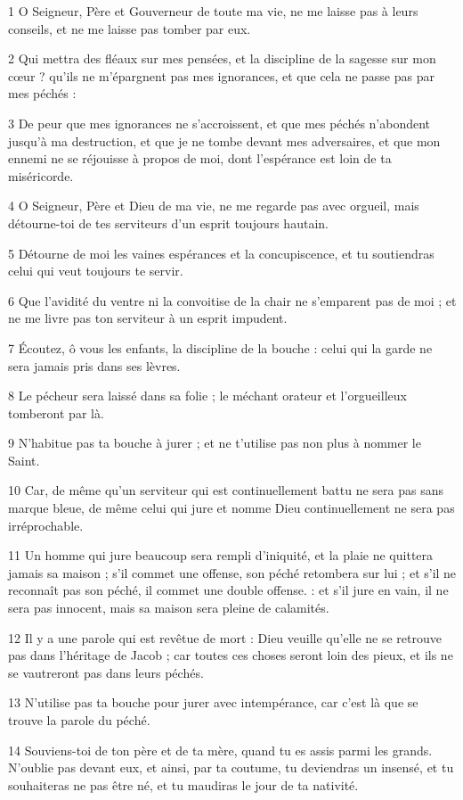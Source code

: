 \par 1 O Seigneur, Père et Gouverneur de toute ma vie, ne me laisse pas à leurs conseils, et ne me laisse pas tomber par eux.
\par 2 Qui mettra des fléaux sur mes pensées, et la discipline de la sagesse sur mon cœur ? qu'ils ne m'épargnent pas mes ignorances, et que cela ne passe pas par mes péchés :
\par 3 De peur que mes ignorances ne s'accroissent, et que mes péchés n'abondent jusqu'à ma destruction, et que je ne tombe devant mes adversaires, et que mon ennemi ne se réjouisse à propos de moi, dont l'espérance est loin de ta miséricorde.
\par 4 O Seigneur, Père et Dieu de ma vie, ne me regarde pas avec orgueil, mais détourne-toi de tes serviteurs d'un esprit toujours hautain.
\par 5 Détourne de moi les vaines espérances et la concupiscence, et tu soutiendras celui qui veut toujours te servir.
\par 6 Que l'avidité du ventre ni la convoitise de la chair ne s'emparent pas de moi ; et ne me livre pas ton serviteur à un esprit impudent.
\par 7 Écoutez, ô vous les enfants, la discipline de la bouche : celui qui la garde ne sera jamais pris dans ses lèvres.
\par 8 Le pécheur sera laissé dans sa folie ; le méchant orateur et l'orgueilleux tomberont par là.
\par 9 N'habitue pas ta bouche à jurer ; et ne t'utilise pas non plus à nommer le Saint.
\par 10 Car, de même qu'un serviteur qui est continuellement battu ne sera pas sans marque bleue, de même celui qui jure et nomme Dieu continuellement ne sera pas irréprochable.
\par 11 Un homme qui jure beaucoup sera rempli d'iniquité, et la plaie ne quittera jamais sa maison ; s'il commet une offense, son péché retombera sur lui ; et s'il ne reconnaît pas son péché, il commet une double offense. : et s'il jure en vain, il ne sera pas innocent, mais sa maison sera pleine de calamités.
\par 12 Il y a une parole qui est revêtue de mort : Dieu veuille qu'elle ne se retrouve pas dans l'héritage de Jacob ; car toutes ces choses seront loin des pieux, et ils ne se vautreront pas dans leurs péchés.
\par 13 N'utilise pas ta bouche pour jurer avec intempérance, car c'est là que se trouve la parole du péché.
\par 14 Souviens-toi de ton père et de ta mère, quand tu es assis parmi les grands. N'oublie pas devant eux, et ainsi, par ta coutume, tu deviendras un insensé, et tu souhaiteras ne pas être né, et tu maudiras le jour de ta nativité.
